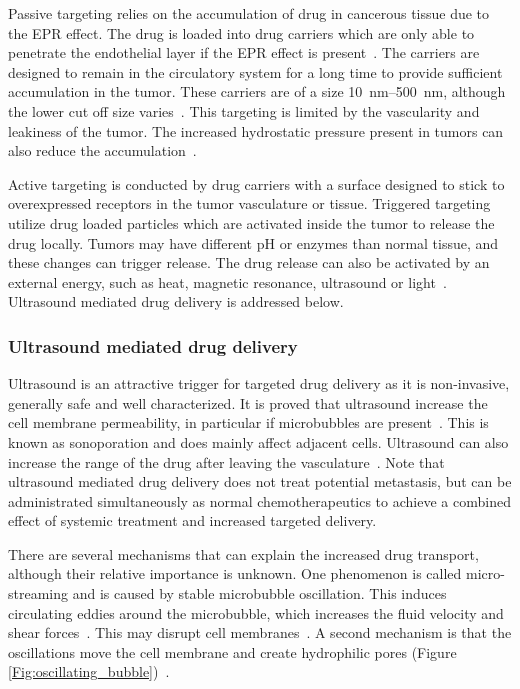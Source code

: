 Passive targeting relies on the accumulation of drug in cancerous tissue due to the EPR effect. The drug is loaded into drug carriers which are only able to penetrate the endothelial layer if the EPR effect is present~\cite{Andresen2010}. The carriers are designed to remain in the circulatory system for a long time to provide sufficient accumulation in the tumor. These carriers are of a size \SIrange{10}{500}{\nano\meter}, although the lower cut off size varies~\cite{Hofmann}. This targeting is limited by the vascularity and leakiness of the tumor. The increased hydrostatic pressure present in tumors can also reduce the accumulation~\cite{Bae2009}.  

Active targeting is conducted by drug carriers with a surface designed to stick to overexpressed receptors in the tumor vasculature or tissue. Triggered targeting utilize drug loaded particles which are activated inside the tumor to release the drug locally. Tumors may have different pH or enzymes than normal tissue, and these changes can trigger release. The drug release can also be activated by an external energy, such as heat, magnetic resonance, ultrasound or light~\cite{Jafari}. Ultrasound mediated drug delivery is addressed below. 
	
\subsubsection{Ultrasound mediated drug delivery}
\label{sec:umdd}
Ultrasound is an attractive trigger for targeted drug delivery as it is non-invasive, generally safe and well characterized. It is proved that ultrasound increase the cell membrane permeability, in particular if microbubbles are present~\cite{VanWamel2006a}. This is known as sonoporation and does mainly affect adjacent cells. Ultrasound can also increase the range of the drug after leaving the vasculature~\cite{Eggen2013}. Note that ultrasound mediated drug delivery does not treat potential metastasis, but can be administrated simultaneously as normal chemotherapeutics to achieve a combined effect of systemic treatment and increased targeted delivery.

There are several mechanisms that can explain the increased drug transport, although their relative importance is unknown. One phenomenon is called micro-streaming and is caused by stable microbubble oscillation. This induces circulating eddies around the microbubble, which increases the fluid velocity and shear forces~\cite{Nyborg1982}. This may disrupt cell membranes~\cite{Marmottant2003}. A second mechanism is that the oscillations move the cell membrane and create hydrophilic pores (Figure \ref{Fig:oscillating_bubble})~\cite{VanWamel2006a}.

